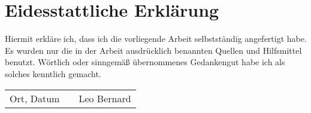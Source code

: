 \chapter*{Eidesstattliche Erklärung}

\thispagestyle{empty}

Hiermit erkläre ich, dass ich die vorliegende Arbeit selbstständig angefertigt habe. Es wurden nur die in der Arbeit ausdrücklich benannten Quellen und Hilfsmittel benutzt. Wörtlich oder sinngemäß übernommenes Gedankengut habe ich als solches kenntlich gemacht.

\vspace{1.5cm}

\begin{center}
\begin{tabular}[h]{lp{2cm}p{5.5cm}}
 \\
\cline{1-1}\cline{3-3}
Ort, Datum& & Leo Bernard\\
\end{tabular}
\end{center}